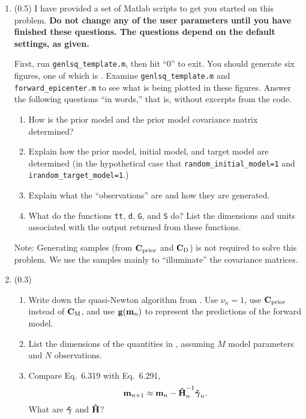 \documentclass[11pt,titlepage,fleqn]{article}
\begin{document}
\begin{enumerate}
\item (0.5) I have provided a set of Matlab scripts to get you started on this problem. {\bf Do not change any of the user parameters until you have finished these questions. The questions depend on the default settings, as given.}

First, run \verb+genlsq_template.m+, then hit ``0'' to exit. You should generate six figures, one of which is . Examine \verb+genlsq_template.m+ and \verb+forward_epicenter.m+ to see what is being plotted in these figures. Answer the following questions ``in words,'' that is, without excerpts from the code.

\begin{enumerate}
\item How is the prior model and the prior model covariance matrix determined?

\item Explain how the prior model, initial model, and target model are determined (in the hypothetical case that \verb+random_initial_model=1+ and \verb+irandom_target_model=1+.)

\item Explain what the ``observations'' are and how they are generated.

\item What do the functions \verb+tt+, \verb+d+, \verb+G+, and \verb+S+ do? List the dimensions and units associated with the output returned from these functions.
\end{enumerate}

Note: Generating samples (from $\mbox{${\bf C}$}_{\rm prior}$ and $\mbox{${\bf C}$}_{\rm D}$) is not required to solve this problem. We use the samples mainly to ``illuminate'' the covariance matrices.


\item (0.3) 

\begin{enumerate}
\item Write down the quasi-Newton algorithm from \citet[][Eq.~6.319]{Tarantola2005}. Use $\nu_n = 1$, use $\mbox{${\bf C}$}_{\rm prior}$ instead of $\mbox{${\bf C}$}_{\rm M}$, and use $\mbox{${\bf g}$}(\mbox{${\bf m}$}_n)$ to represent the predictions of the forward model.

\item List the dimensions of the quantities in , assuming $M$ model parameters and $N$ observations.

\item Compare Eq.~6.319 with Eq.~6.291,
%
\begin{equation}
\mbox{${\bf m}$}_{n+1} \approx \mbox{${\bf m}$}_{n} - \mbox{\boldmath{$\hat{\rm H}$}}^{-1}_n \mbox{\boldmath{$\hat{\gamma}$}}_n.
\end{equation}
%
What are $\mbox{\boldmath{$\hat{\gamma}$}}$ and $\mbox{\boldmath{$\hat{\rm H}$}}$?


\end{enumerate}
\end{enumerate}
\end{document}
